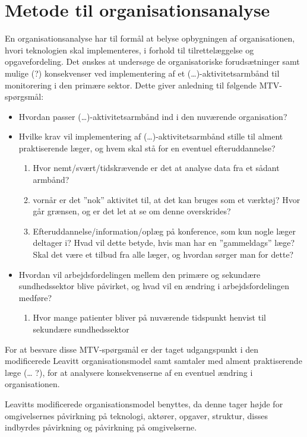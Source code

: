\section{Metode til organisationsanalyse}
En organisationsanalyse har til formål at belyse opbygningen af organisationen, hvori teknologien skal implementeres, i forhold til tilrettelæggelse og opgavefordeling. Det ønskes at undersøge de organisatoriske forudsætninger samt mulige (?) konsekvenser ved implementering af et (…)-aktivitetsarmbånd til monitorering i den primære sektor. Dette giver anledning til følgende MTV-spørgsmål:

\begin{itemize}
\item Hvordan passer  (…)-aktivitetsarmbånd ind i den nuværende organisation? 
\item Hvilke krav vil implementering af (…)-aktivitetsarmbånd stille til alment praktiserende læger, og hvem skal stå for en eventuel efteruddannelse? 
\begin{enumerate}
\item Hvor nemt/svært/tidskrævende er det at analyse data fra et sådant armbånd?
\item vornår er det ”nok” aktivitet til, at det kan bruges som et værktøj? Hvor går grænsen, og er det let at se om denne overskrides? 
\item Efteruddannelse/information/oplæg på konference, som kun nogle læger deltager i? Hvad vil dette betyde, hvis man har en ”gammeldags” læge?  Skal det være et tilbud fra alle læger, og hvordan sørger man for dette?
\end{enumerate}
\item  Hvordan vil arbejdsfordelingen mellem den primære og sekundære sundhedssektor blive påvirket, og hvad vil en ændring i arbejdsfordelingen medføre?
\begin{enumerate}
\item Hvor mange patienter bliver på nuværende tidspunkt henvist til sekundære sundhedssektor
\end{enumerate} 
\end{itemize}

For at besvare disse MTV-spørgsmål er der taget udgangspunkt i den modificerede Leavitt organisationsmodel samt samtaler med alment praktiserende læge (… ?), for at analysere konsekvenserne af en eventuel ændring i organisationen. 

Leavitts modificerede organisationsmodel benyttes, da denne tager højde for omgivelsernes påvirkning på teknologi, aktører, opgaver, struktur, disses indbyrdes påvirkning og påvirkning på omgivelserne. 
